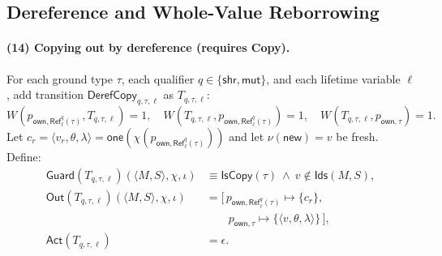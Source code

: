 \documentclass[runningheads]{llncs}
\begin{document}
\subsection{Dereference and Whole-Value Reborrowing}
\label{sec:method:deref}

\paragraph{(14) Copying out by dereference (requires Copy).}
For each ground type $\tau$, each qualifier $q\in\{\mathsf{shr},\mathsf{mut}\}$, and each lifetime variable $\ell$, add transition $\mathsf{DerefCopy}_{q,\tau,\ell}$ as $T_{q,\tau,\ell}$:
\begin{equation*}
  W(p_{\mathsf{own},\mathsf{Ref}^{q}_{\ell}(\tau)},T_{q,\tau,\ell})=1,\quad
  W(T_{q,\tau,\ell},p_{\mathsf{own},\mathsf{Ref}^{q}_{\ell}(\tau)})=1,\quad
  W(T_{q,\tau,\ell},p_{\mathsf{own},\tau})=1.
\end{equation*}
Let $c_r=\langle v_r,\theta,\lambda\rangle=\mathsf{one}(\chi(p_{\mathsf{own},\mathsf{Ref}^{q}_{\ell}(\tau)}))$
and let $\nu(\mathsf{new})=v$ be fresh. Define:
\begin{align*}
\mathsf{Guard}(T_{q,\tau,\ell})(\langle M,S\rangle,\chi,\iota)
&\equiv \mathsf{IsCopy}(\tau)\ \wedge\ v\notin \mathsf{Ids}(M,S),\\
\mathsf{Out}(T_{q,\tau,\ell})(\langle M,S\rangle,\chi,\iota)
&= [\,p_{\mathsf{own},\mathsf{Ref}^{q}_{\ell}(\tau)}\mapsto \{c_r\},\\
&\qquad p_{\mathsf{own},\tau}\mapsto \{\langle v,\theta,\lambda\rangle\}\,],\\
\mathsf{Act}(T_{q,\tau,\ell})
&= \epsilon.
\end{align*}
\end{document}
